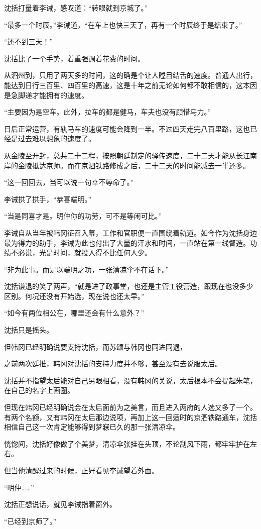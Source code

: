 沈括打量着李诫，感叹道：“转眼就到京城了。”

“最多一个时辰。”李诫道，“在车上也快三天了，再有一个时辰终于是结束了。”

“还不到三天！”

沈括比了一个手势，着重强调着花费的时间。

从泗州到，只用了两天多的时间，这的确是个让人瞠目结舌的速度。普通人出行，能达到日行三百里、四百里的高速，这是十年之前无论如何都不敢相信的，这本因是急脚递才能拥有的速度。

“主要因为是空车。此外，拉车的都是健马，车夫也没有顾惜马力。”

日后正常运营，有轨马车的速度可能会降到一半。不过四天走完八百里路，这也已经是过去难以想象的速度了。

从金陵至开封，总共二十二程，按照朝廷制定的驿传速度，二十二天才能从长江南岸的金陵抵达京师。而在京泗铁路修成之后，二十二天的时间能减去一半还多。

“这一回回去，当可以说一句幸不辱命了。”

李诫拱了拱手，“恭喜端明。”

“当是同喜才是。明仲你的功劳，可不是等闲可比。”

李诫自从当年被韩冈征召入幕，工作和官职便一直围绕着轨道。如今作为沈括身边最为得力的助手，李诫为此也付出了大量的汗水和时间，一直站在第一线督造。功绩不必说，光是时间，就投入得不比任何人少。

“非为此事。而是以端明之功，一张清凉伞不在话下。”

沈括谦退的笑了两声，“就是进了政事堂，也还是主管工役营造，跟现在也没多少区别。何况还没有开始选，现在说也还太早。”

“如今有两位相公在，哪里还会有什么意外？”

沈括只是摇头。

但韩冈已经明确说要支持沈括，而苏颂与韩冈也同进同退，

之前两次廷推，韩冈对沈括的支持力度并不够，甚至没有去说服太后。

沈括并不指望太后能对自己另眼相看，没有韩冈的关说，太后根本不会提起朱笔，在自己的名字上画圈。

但现在韩冈已经明确说会在太后面前为之美言，而且进入两府的人选又多了一个。有两个名额，又有韩冈在太后那边说项，再加上这一回适时的京泗铁路通车，沈括相信自己这一次肯定能够得到梦寐已久的那一张清凉伞。

恍惚间，沈括好像做了个美梦，清凉伞张挂在头顶，不论刮风下雨，都牢牢护在左右。

但当他清醒过来的时候，正好看见李诫望着外面。

“明仲……”

沈括正想说话，就见李诫指着窗外。

“已经到京师了。”

